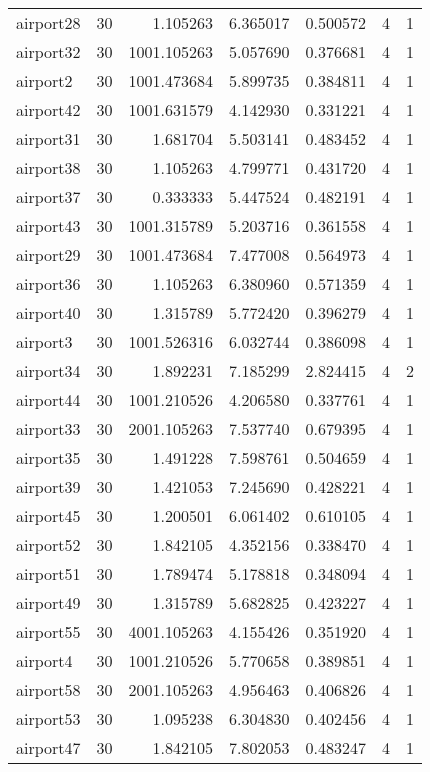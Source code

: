 \begin{longtable}{|l|r|r|r|r|r|r|}
airport28 & 30 & 1.105263 & 6.365017 & 0.500572 & 4 & 1 \\
airport32 & 30 & 1001.105263 & 5.057690 & 0.376681 & 4 & 1 \\
airport2 & 30 & 1001.473684 & 5.899735 & 0.384811 & 4 & 1 \\
airport42 & 30 & 1001.631579 & 4.142930 & 0.331221 & 4 & 1 \\
airport31 & 30 & 1.681704 & 5.503141 & 0.483452 & 4 & 1 \\
airport38 & 30 & 1.105263 & 4.799771 & 0.431720 & 4 & 1 \\
airport37 & 30 & 0.333333 & 5.447524 & 0.482191 & 4 & 1 \\
airport43 & 30 & 1001.315789 & 5.203716 & 0.361558 & 4 & 1 \\
airport29 & 30 & 1001.473684 & 7.477008 & 0.564973 & 4 & 1 \\
airport36 & 30 & 1.105263 & 6.380960 & 0.571359 & 4 & 1 \\
airport40 & 30 & 1.315789 & 5.772420 & 0.396279 & 4 & 1 \\
airport3 & 30 & 1001.526316 & 6.032744 & 0.386098 & 4 & 1 \\
airport34 & 30 & 1.892231 & 7.185299 & 2.824415 & 4 & 2 \\
airport44 & 30 & 1001.210526 & 4.206580 & 0.337761 & 4 & 1 \\
airport33 & 30 & 2001.105263 & 7.537740 & 0.679395 & 4 & 1 \\
airport35 & 30 & 1.491228 & 7.598761 & 0.504659 & 4 & 1 \\
airport39 & 30 & 1.421053 & 7.245690 & 0.428221 & 4 & 1 \\
airport45 & 30 & 1.200501 & 6.061402 & 0.610105 & 4 & 1 \\
airport52 & 30 & 1.842105 & 4.352156 & 0.338470 & 4 & 1 \\
airport51 & 30 & 1.789474 & 5.178818 & 0.348094 & 4 & 1 \\
airport49 & 30 & 1.315789 & 5.682825 & 0.423227 & 4 & 1 \\
airport55 & 30 & 4001.105263 & 4.155426 & 0.351920 & 4 & 1 \\
airport4 & 30 & 1001.210526 & 5.770658 & 0.389851 & 4 & 1 \\
airport58 & 30 & 2001.105263 & 4.956463 & 0.406826 & 4 & 1 \\
airport53 & 30 & 1.095238 & 6.304830 & 0.402456 & 4 & 1 \\
airport47 & 30 & 1.842105 & 7.802053 & 0.483247 & 4 & 1 \\

\end{longtable}
